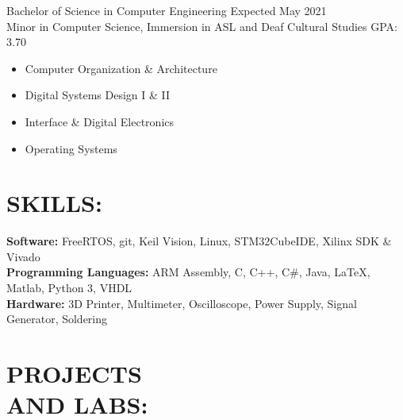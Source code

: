 \documentclass[line,margin]{res}
\newcommand{\SECTIONOFFSET}{-5pt}
\newcommand{\ITEMOFFSET}{-8pt}
\begin{document}
\begin{resume}
		Bachelor of Science in Computer Engineering \hfill Expected May 2021\\ 
		Minor in Computer Science, Immersion in ASL and Deaf Cultural Studies \hfill GPA: 3.70

		\begin{multicols}{2}
			\setlength\columnsep{1pt}
			\begin{itemize}
				\setlength{\itemindent}{-10pt}
				\item[] Computer Organization \& Architecture
				\item[] Digital Systems Design I \& II
				\item[] \hspace{16pt} Interface \& Digital Electronics
				\item[] \hspace{16pt} Operating Systems
			\end{itemize}
		\end{multicols}

		\vspace{\SECTIONOFFSET}

	\section{SKILLS:}

		\textbf{Software:} FreeRTOS, git, Keil \si{\micro}\hspace{-.5pt}Vision, Linux, STM32CubeIDE, Xilinx SDK \& Vivado\\
		\textbf{Programming Languages:} ARM Assembly, C, C++, C\#, Java, \LaTeX, Matlab, Python 3, VHDL \\
		\textbf{Hardware:} 3D Printer, Multimeter, Oscilloscope, Power Supply, Signal Generator, Soldering

		\vspace{\SECTIONOFFSET}

	\section{PROJECTS \\AND LABS:}



\end{resume}
\end{document}
